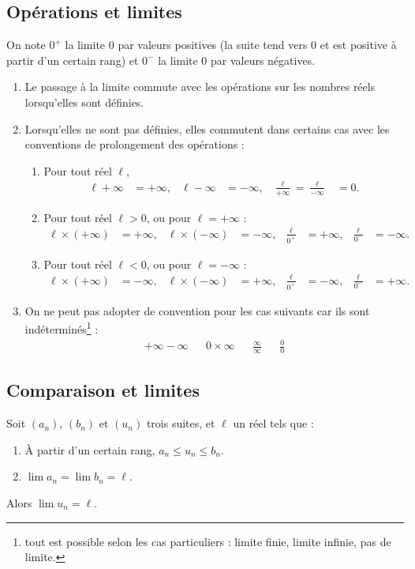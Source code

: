 \documentclass[a4paper,11pt,DIV14,BCOR0mm]{scrartcl}
\begin{document}
\subsection{Opérations et limites}
On note $0^+$ la limite 0 par valeurs positives (la suite tend vers 0 et 
est positive à partir d'un certain rang) et $0^-$ la limite 0 par valeurs négatives.
\begin{theoreme}[Admis]
\begin{enumerate}
 \item Le passage à la limite commute avec les opérations sur les nombres réels
lorsqu'elles sont définies.
  \item Lorsqu'elles ne sont pas définies, elles commutent dans certains cas avec les conventions de prolongement 
des opérations :
  \begin{enumerate}
   \item Pour tout réel $\ell$,\begin{align*}
	  \ell+\infty&=+\infty,&\ell-\infty&=-\infty,&\frac{\ell}{+\infty}=\frac{\ell}{-\infty}&=0.
	  \end{align*}
   \item Pour tout réel $\ell>0$, ou pour $\ell=+\infty$ :\begin{align*}
	  \ell\times(+\infty)&=+\infty,&\ell\times(-\infty)&=-\infty,
			  &\frac{\ell}{0^+}&=+\infty,&\frac{\ell}{0^-}&=-\infty.
	  \end{align*}
    \item Pour tout réel $\ell<0$, ou pour $\ell=-\infty$ :\begin{align*}
	  \ell\times(+\infty)&=-\infty,&\ell\times(-\infty)&=+\infty,
			  &\frac{\ell}{0^+}&=-\infty,&\frac{\ell}{0^-}&=+\infty.
	  \end{align*}
  \end{enumerate}
  \item On ne peut pas adopter de convention pour les cas suivants car ils sont indéterminés\footnote{tout est possible
    selon les cas particuliers : limite finie,
    limite infinie, pas de limite.} :
    \begin{align*}
    +\infty-\infty&&0\times\infty&&\frac{\infty}{\infty}&&\frac{0}{0}
\end{align*}
\end{enumerate}
\end{theoreme}

\subsection{Comparaison et limites}
\begin{theoreme}
 Soit $(a_n)$, $(b_n)$ et $(u_n)$ trois suites, et $\ell$ un réel tels que :
\begin{enumerate}
 \item \`A partir d'un certain rang, $a_n\leq u_n\leq b_n$.
 \item $\displaystyle\lim a_n=\lim b_n=\ell$.
\end{enumerate}
Alors $\displaystyle\lim u_n=\ell$.
\end{theoreme}
\end{document}
